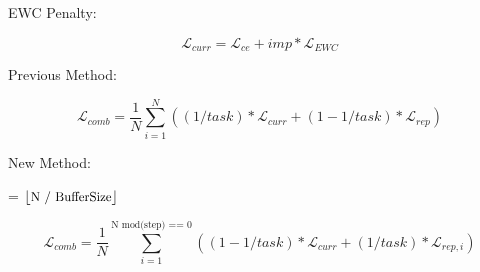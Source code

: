\documentclass{article}
\begin{document}
\begin{flushleft}
EWC Penalty:

\medskip
$$\mathscr{L}_{curr} = \mathscr{L}_{ce} + imp * \mathscr{L}_{EWC}$$
\end{flushleft}

\bigbreak
\begin{flushleft}
Previous Method:

\medskip
$$\mathscr{L}_{comb} = \frac{1}{N}\sum_{i=1}^N((1/task) * \mathscr{L}_{curr} + (1-1/task) * \mathscr{L}_{rep})$$
\end{flushleft}

\bigbreak
\begin{flushleft}
New Method:

\medskip
{} = $\lfloor{\text{\small{N / BufferSize}}}\rfloor$

\medskip
$$\mathscr{L}_{comb} = \frac{1}{N}\sum_{i=1}^{\text{N mod(step) == 0}}((1-1/task) * \mathscr{L}_{curr} + (1/task) * \mathscr{L}_{rep, i})$$
    
\end{flushleft}
\end{document}

